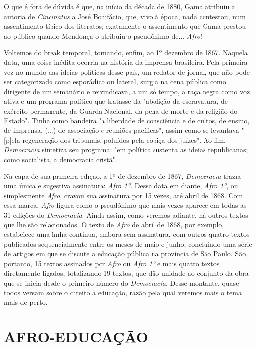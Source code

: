 O que é fora de dúvida é que, no início da década de 1880, Gama atribuiu
a autoria de \emph{Cincinatus} a José Bonifácio, que, vivo à época, nada
contestou, num assentimento típico dos literatos; exatamente o
assentimento que Gama prestou ao público quando Mendonça o atribuiu o
pseudônimo de... \emph{Afro}!

Voltemos do break temporal, tornando, enfim, ao 1º dezembro de 1867.
Naquela data, uma coisa inédita ocorria na história da imprensa
brasileira. Pela primeira vez no mundo das ideias políticas desse país,
um redator de jornal, que não pode ser categorizado como esporádico ou
lateral, surgia na cena pública como dirigente de um semanário e
reivindicava, a um só tempo, a raça negra como voz ativa e um programa
político que tratasse da "abolição da escravatura, de exército
permanente, da Guarda Nacional, da pena de morte e da religião do
Estado". Tinha como bandeira "a liberdade de consciência e de cultos, de
ensino, de imprensa, (...) de associação e reuniões pacíficas", assim
como se levantava "{[}p{]}ela regeneração dos tribunais, poluídos pela
cobiça dos juízes". Ao fim, \emph{Democracia} sintetiza seu programa:
"em política sustenta as ideias republicanas; como socialista, a
democracia cristã".

Na capa de sua primeira edição, a 1º de dezembro de 1867,
\emph{Democracia} trazia uma única e sugestiva assinatura: \emph{Afro
1º}. Dessa data em diante, \emph{Afro 1º}, ou simplesmente \emph{Afro},
cravou sua assinatura por 15 vezes, até abril de 1868. Com essa marca,
\emph{Afro} figura como o pseudônimo que mais vezes aparece em todas as
31 edições do \emph{Democracia}. Ainda assim, como veremos adiante, há
outros textos que lhe são relacionados. O texto de \emph{Afro} de abril
de 1868, por exemplo, estabelece uma linha contínua, embora sem
assinatura, com outros quatro textos publicados sequencialmente entre os
meses de maio e junho, concluindo uma série de artigos em que se discute
a educação pública na província de São Paulo. São, portanto, 15 textos
assinados por \emph{Afro} ou \emph{Afro 1º} e mais quatro textos
diretamente ligados, totalizando 19 textos, que dão unidade ao conjunto
da obra que se inicia desde o primeiro número do \emph{Democracia}.
Desse montante, quase todos versam sobre o direito à educação, razão
pela qual veremos mais o tema mais de perto.

\section{AFRO-EDUCAÇÃO}

